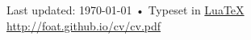 \documentclass[10pt, a4paper]{article}
\begin{document}
\renewcommand{\refname}{\section*{Publications}\subsection*{Unpublished works}}



\vfill{}

\begin{center}
{\scriptsize  Last updated: \today\- •\- 
Typeset in \href{http://nitens.org/taraborelli/cvtex}{
Lua\TeX}\\
\href{http://foat.github.io/cv/cv.pdf}{http://foat.github.io/cv/cv.pdf}}
\end{center}
\end{document}

